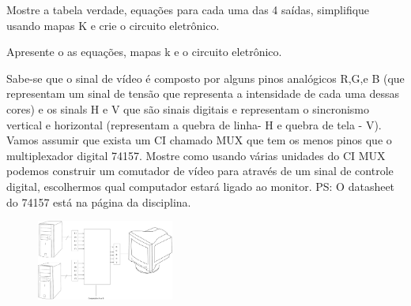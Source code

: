 \documentclass[a4paper,10pt]{article}
\begin{document}

\begin{center}
\large{}
\end{center}


 Mostre a tabela verdade, equações para cada uma das 4 saídas, simplifique usando mapas K e crie o circuito eletrônico.



\begin{center}
\large{}
\end{center}



 Apresente o as equações, mapas k e o circuito eletrônico.



 Sabe-se que o sinal de vídeo é composto por alguns pinos analógicos R,G,e B (que representam um sinal de tensão que representa a intensidade de cada uma dessas cores) e os sinals H e V que são sinais digitais e representam o sincronismo vertical e horizontal (representam a quebra de linha-  H e quebra de tela - V). Vamos assumir que exista um CI chamado MUX que tem os menos pinos que o multiplexador digital 74157. Mostre como usando várias unidades do CI MUX podemos construir um comutador de vídeo para através de um sinal de controle digital, escolhermos qual computador estará ligado ao monitor. PS: O datasheet do 74157 está na página da disciplina.

\begin{figure}[htb]
 \centering\includegraphics[width=0.4\textwidth]{multiplexador}
\end{figure}
\end{document}
